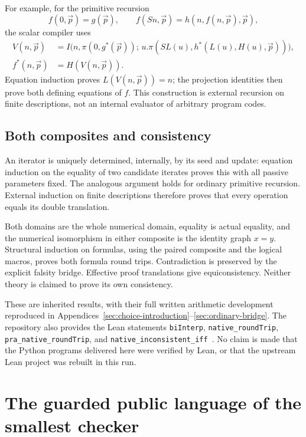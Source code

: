 \documentclass[11pt,letterpaper]{article}
\theoremstyle{definition}\newtheorem{definition}[theorem]{Definition}
\theoremstyle{remark}\newtheorem{remark}[theorem]{Remark}
\begin{document}
For example, for the primitive recursion
\[
 f(0,\vec p)=g(\vec p),\qquad
 f(Sn,\vec p)=h(n,f(n,\vec p),\vec p),
\]
the scalar compiler uses
\begin{align*}
 V(n,\vec p)&=I\bigl(n,\pi(0,g^*(\vec p));\,
 u.\pi(SL(u),h^*(L(u),H(u),\vec p))\bigr),\\
 f^*(n,\vec p)&=H(V(n,\vec p)).
\end{align*}
Equation induction proves $L(V(n,\vec p))=n$; the projection identities
then prove both defining equations of $f$. This construction is external
recursion on finite descriptions, not an internal evaluator of arbitrary
program codes.

\subsection{Both composites and consistency}

An iterator is uniquely determined, internally, by its seed and update:
equation induction on the equality of two candidate iterates proves this
with all passive parameters fixed. The analogous argument holds for
ordinary primitive recursion. External induction on finite descriptions
therefore proves that every operation equals its double translation.

Both domains are the whole numerical domain, equality is actual equality,
and the numerical isomorphism in either composite is the identity graph
$x=y$. Structural induction on formulas, using the paired composite and
the logical macros, proves both formula round trips. Contradiction is
preserved by the explicit falsity bridge. Effective proof translations
give equiconsistency. Neither theory is claimed to prove its own
consistency.

These are inherited results, with their full written arithmetic
development reproduced in Appendices~\ref{sec:choice-introduction}--\ref{sec:ordinary-bridge}.
The repository also provides the Lean statements
\texttt{biInterp}, \texttt{native\_roundTrip},
\texttt{pra\_native\_roundTrip}, and
\texttt{native\_inconsistent\_iff}~\cite{snapshot}.
No claim is made that the Python programs delivered here were verified
by Lean, or that the upstream Lean project was rebuilt in this run.

\section{The guarded public language of the smallest checker}
\label{sec:guarded-main}
\end{document}
